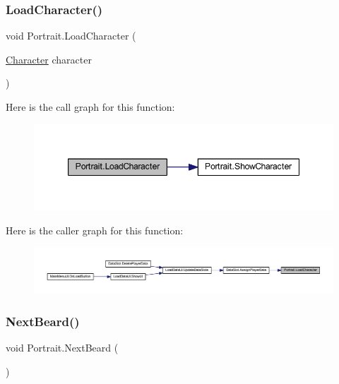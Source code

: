 \subsubsection{\texorpdfstring{LoadCharacter()}{LoadCharacter()}}
{\footnotesize\ttfamily void Portrait.\+Load\+Character (\begin{DoxyParamCaption}\item[{\mbox{\hyperlink{class_character}{Character}}}]{character }\end{DoxyParamCaption})}

Here is the call graph for this function\+:\nopagebreak
\begin{figure}[H]
\begin{center}
\leavevmode
\includegraphics[width=347pt]{class_portrait_a003483e7707bbb34e09ef3736e5b5b41_cgraph}
\end{center}
\end{figure}
Here is the caller graph for this function\+:\nopagebreak
\begin{figure}[H]
\begin{center}
\leavevmode
\includegraphics[width=350pt]{class_portrait_a003483e7707bbb34e09ef3736e5b5b41_icgraph}
\end{center}
\end{figure}
\mbox{\label{class_portrait_a357f23630fd1689f2de8ef7a114c151e}} 
\subsubsection{\texorpdfstring{NextBeard()}{NextBeard()}}
{\footnotesize\ttfamily void Portrait.\+Next\+Beard (\begin{DoxyParamCaption}{ }\end{DoxyParamCaption})}

